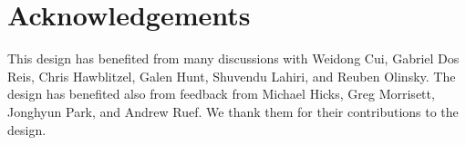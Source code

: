 \section{Acknowledgements}

This design has benefited from many discussions with Weidong Cui, Gabriel Dos Reis, 
Chris Hawblitzel, Galen Hunt, Shuvendu Lahiri, and Reuben Olinsky.  The design has
benefited also from feedback from Michael Hicks, Greg Morrisett, Jonghyun
Park, and Andrew Ruef. We thank them for their contributions to the design.


